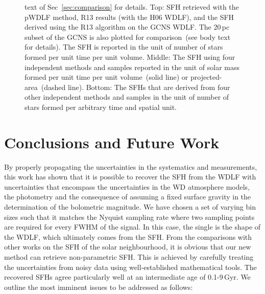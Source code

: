 \documentclass[fleqn,usenatbib]{mnras}
\begin{document}
\begin{figure}
{  text of Sec~\ref{sec:comparison} for details. Top: SFH retrieved with the
  pWDLF method, R13 results (with the H06 WDLF), and the SFH derived using the
  R13 algorithm on the GCNS WDLF. The 20\,pc subset of the GCNS is
  also plotted for comparison~(see body text for details). The SFH is reported
  in the unit of number of stars formed per unit time per unit volume.
  Middle: The SFH using four independent methods and samples reported in the
  unit of solar mass formed per unit time per unit volume~(solid line) or
  projected-area~(dashed line). Bottom: The SFHs that are derived from four
  other independent methods and samples in the unit of number of stars formed
  per arbitrary time and spatial unit.}
  \label{fig:comparison}
\end{figure}

\section{Conclusions and Future Work}
\label{sec:conclusion}
By properly propagating the uncertainties in the systematics and measurements,
this work has shown that it is possible to recover the SFH 
from the WDLF with uncertainties that encompass the uncertainties in the WD
atmosphere models, the photometry and the consequence of assuming a fixed
surface gravity in the determination of the bolometric magnitude. We have chosen
a set of varying bin sizes such that it matches the Nyquist sampling rate where
two sampling points are required for every FWHM of the signal. In this case,
the single is the shape of the WDLF, which ultimately comes from the SFH. From
the comparisons with other works on the SFH of the solar neighbourhood, it is
obvious that our new method can retrieve non-parametric SFH. This is achieved by
carefully treating the uncertainties from noisy data using well-established
mathematical tools. The recovered SFHs agree particularly well at an
intermediate age of 0.1-9\,Gyr. We outline the most imminent issues to be
addressed as follows:

\end{document}
